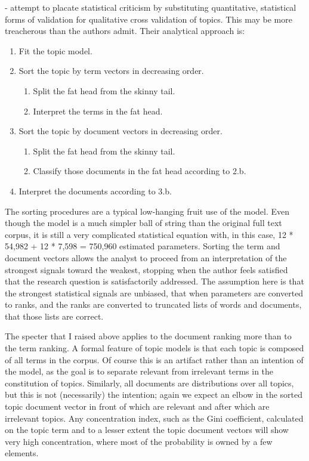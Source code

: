 \documentclass[]{book}
\providecommand{\tightlist}{%
  \setlength{\itemsep}{0pt}\setlength{\parskip}{0pt}}
\theoremstyle{definition}
\theoremstyle{definition}
\theoremstyle{definition}
\theoremstyle{remark}
\begin{document}
\citet{DiMaggio2013Exploiting}- attempt to placate statistical criticism
by substituting quantitative, statistical forms of validation for
qualitative cross validation of topics. This may be more treacherous
than the authors admit. Their analytical approach is:

\begin{enumerate}
\def\labelenumi{\arabic{enumi}.}
\tightlist
\item
  Fit the topic model.
\item
  Sort the topic by term vectors in decreasing order.

  \begin{enumerate}
  \def\labelenumii{\alph{enumii}.}
  \tightlist
  \item
    Split the fat head from the skinny tail.
  \item
    Interpret the terms in the fat head.
  \end{enumerate}
\item
  Sort the topic by document vectors in decreasing order.

  \begin{enumerate}
  \def\labelenumii{\alph{enumii}.}
  \tightlist
  \item
    Split the fat head from the skinny tail.
  \item
    Classify those documents in the fat head according to 2.b.
  \end{enumerate}
\item
  Interpret the documents according to 3.b.
\end{enumerate}

The sorting procedures are a typical low-hanging fruit use of the model.
Even though the model is a much simpler ball of string than the original
full text corpus, it is still a very complicated statistical equation
with, in this case, 12 * 54,982 + 12 * 7,598 = 750,960 estimated
parameters. Sorting the term and document vectors allows the analyst to
proceed from an interpretation of the strongest signals toward the
weakest, stopping when the author feels satisfied that the research
question is satisfactorily addressed. The assumption here is that the
strongest statistical signals are unbiased, that when parameters are
converted to ranks, and the ranks are converted to truncated lists of
words and documents, that those lists are correct.

The specter that I raised above applies to the document ranking more
than to the term ranking. A formal feature of topic models is that each
topic is composed of all terms in the corpus. Of course this is an
artifact rather than an intention of the model, as the goal is to
separate relevant from irrelevant terms in the constitution of topics.
Similarly, all documents are distributions over all topics, but this is
not (necessarily) the intention; again we expect an elbow in the sorted
topic document vector in front of which are relevant and after which are
irrelevant topics. Any concentration index, such as the Gini
coefficient, calculated on the topic term and to a lesser extent the
topic document vectors will show very high concentration, where most of
the probability is owned by a few elements.
\end{document}

